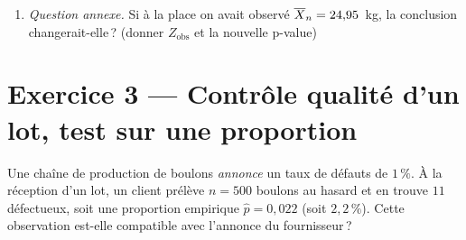 \begin{enumerate}
{\begin{solution}
      Le test étant \textbf{bilatéral} (Q1), un écart \og aussi extrême \fg{} que $Z_{\text{obs}}$ regroupe les valeurs dans \emph{les deux queues} de la loi normale : $\{|Z| \ge 2{,}4\}$. D'où la formule bilatérale (voir recette en début de TD) :
      \[
        \text{p-value} = P(|Z| \ge 2{,}4 \mid H_0) = 2\,(1 - \Phi(2{,}4)) \approx 2 \times (1 - 0{,}9918) \approx 0{,}0164.
      \]
      $0{,}0164 < 0{,}05$ : on \textbf{rejette} $H_0$. Si la machine était bien réglée à $25$~kg, on n'aurait observé un écart aussi marqué que dans $1{,}6\,\%$ des cas environ : ce n'est pas crédible. La machine est déréglée (vers le bas, vu le signe de $Z_{\text{obs}}$).
    \end{solution}
  }{}

  \item \emph{Question annexe.} Si à la place on avait observé $\overline{X}_n = 24{,}95$~kg, la conclusion changerait-elle\,? (donner $Z_{\text{obs}}$ et la nouvelle p-value)
\end{enumerate}

\vspace{0.5cm}

\section*{Exercice 3 --- Contrôle qualité d'un lot, test sur une proportion}

Une chaîne de production de boulons \emph{annonce} un taux de défauts de $1\,\%$. À la réception d'un lot, un client prélève $n=500$ boulons au hasard et en trouve $11$ défectueux, soit une proportion empirique $\widehat{p} = 0{,}022$ (soit $2{,}2\,\%$). Cette observation est-elle compatible avec l'annonce du fournisseur\,?

